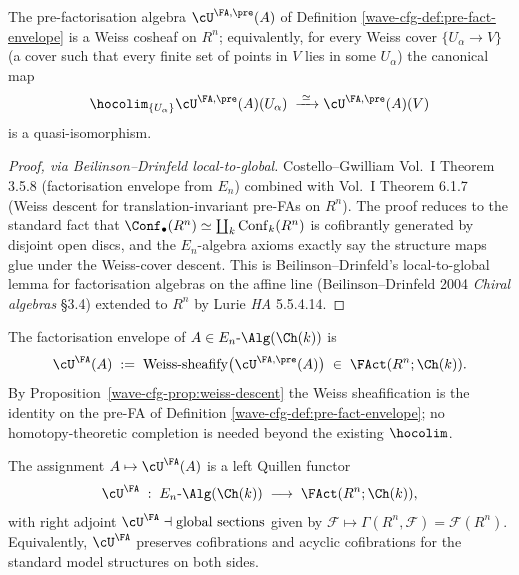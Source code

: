\begin{proposition}
\label{wave-cfg-prop:weiss-descent}
The pre-factorisation algebra $\cU^{\FA,\pre}(A)$ of Definition
\ref{wave-cfg-def:pre-fact-envelope} is a Weiss cosheaf on $R^n$;
equivalently, for every Weiss cover
$\{U_\alpha\to V\}$ (a cover such that every finite set of points in
$V$ lies in some $U_\alpha$) the canonical map
\[
\hocolim_{\{U_\alpha\}}\cU^{\FA,\pre}(A)(U_\alpha)\;\xrightarrow{\;\simeq\;}
\cU^{\FA,\pre}(A)(V)
\]
is a quasi-isomorphism.
\end{proposition}

\begin{proof}[Proof, via Beilinson--Drinfeld local-to-global]
Costello--Gwilliam Vol.~I Theorem 3.5.8 (factorisation envelope from
$E_n$) combined with Vol.~I Theorem 6.1.7 (Weiss descent for
translation-invariant pre-FAs on $R^n$). The proof reduces to the
standard fact that
$\Conf_\bullet(R^n)\simeq\coprod_k\mathrm{Conf}_k(R^n)$ is cofibrantly
generated by disjoint open discs, and the $E_n$-algebra axioms exactly
say the structure maps glue under the Weiss-cover descent. This is
Beilinson--Drinfeld's local-to-global lemma for factorisation algebras
on the affine line (Beilinson--Drinfeld 2004 \emph{Chiral algebras}
\S 3.4) extended to $R^n$ by Lurie \emph{HA} 5.5.4.14.
\end{proof}

\begin{definition}
\label{wave-cfg-def:fact-envelope}
The factorisation envelope of $A\in E_n\text{-}\Alg(\Ch(k))$ is
\[
\cU^\FA(A)\;:=\;\mathrm{Weiss\text{-}sheafify}\bigl(\cU^{\FA,\pre}(A)\bigr)
\;\in\;\FAct(R^n;\Ch(k)).
\]
By Proposition~\ref{wave-cfg-prop:weiss-descent} the Weiss sheafification
is the identity on the pre-FA of Definition
\ref{wave-cfg-def:pre-fact-envelope}; no homotopy-theoretic completion
is needed beyond the existing $\hocolim$.
\end{definition}

\begin{proposition}
\label{wave-cfg-prop:cU-FA-left-quillen}
The assignment $A\mapsto\cU^\FA(A)$ is a left Quillen functor
\[
\cU^\FA\;:\;E_n\text{-}\Alg(\Ch(k))\;\longrightarrow\;\FAct(R^n;\Ch(k)),
\]
with right adjoint $\cU^\FA\dashv\mathrm{global\ sections}$ given by
$\mathcal F\mapsto\Gamma(R^n,\mathcal F)=\mathcal F(R^n)$.
Equivalently, $\cU^\FA$ preserves cofibrations and acyclic cofibrations
for the standard model structures on both sides.
\end{proposition}


